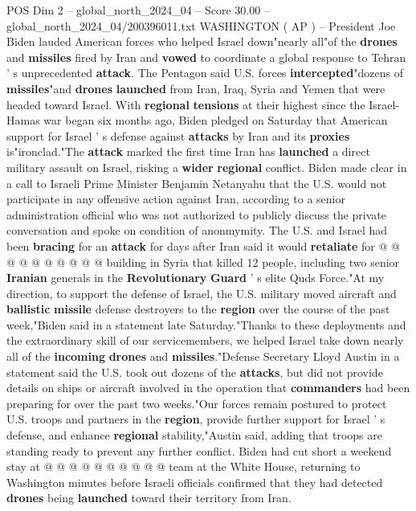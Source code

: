 \begin{textsample}{POS Dim 2 – global\_north\_2024\_04 – Score 30.00 – global\_north\_2024\_04/200396011.txt}  \label{ex:f2_pos_163}
WASHINGTON ( AP ) -- President Joe Biden lauded American forces who helped Israel down"nearly all"of the \textbf{drones} and \textbf{missiles} fired by Iran and \textbf{vowed} to coordinate a global response to Tehran ' s unprecedented \textbf{attack}.
The Pentagon said U.S. forces \textbf{intercepted}"dozens of \textbf{missiles}"and \textbf{drones} \textbf{launched} from Iran, Iraq, Syria and Yemen that were headed toward Israel.
With \textbf{regional} \textbf{tensions} at their highest since the Israel-Hamas war began six months ago, Biden pledged on Saturday that American support for Israel ' s defense against \textbf{attacks} by Iran and its \textbf{proxies} is"ironclad."The \textbf{attack} marked the first time Iran has \textbf{launched} a direct military assault on Israel, risking a \textbf{wider} \textbf{regional} conflict.
Biden made clear in a call to Israeli Prime Minister Benjamin Netanyahu that the U.S. would not participate in any offensive action against Iran, according to a senior administration official who was not authorized to publicly discuss the private conversation and spoke on condition of anonmymity.
The U.S. and Israel had been \textbf{bracing} for an \textbf{attack} for days after Iran said it would \textbf{retaliate} for @ @ @ @ @ @ @ @ @ @ building in Syria that killed 12 people, including two senior \textbf{Iranian} generals in the \textbf{Revolutionary} \textbf{Guard} ' s elite Quds Force."At my direction, to support the defense of Israel, the U.S. military moved aircraft and \textbf{ballistic} \textbf{missile} defense destroyers to the \textbf{region} over the course of the past week,"Biden said in a statement late Saturday."Thanks to these deployments and the extraordinary skill of our servicemembers, we helped Israel take down nearly all of the \textbf{incoming} \textbf{drones} and \textbf{missiles}."Defense Secretary Lloyd Austin in a statement said the U.S. took out dozens of the \textbf{attacks}, but did not provide details on ships or aircraft involved in the operation that \textbf{commanders} had been preparing for over the past two weeks."Our forces remain postured to protect U.S. troops and partners in the \textbf{region}, provide further support for Israel ' s defense, and enhance \textbf{regional} stability,"Austin said, adding that troops are standing ready to prevent any further conflict.
Biden had cut short a weekend stay at @ @ @ @ @ @ @ @ @ @ team at the White House, returning to Washington minutes before Israeli officials confirmed that they had detected \textbf{drones} being \textbf{launched} toward their territory from Iran.

\end{textsample}
